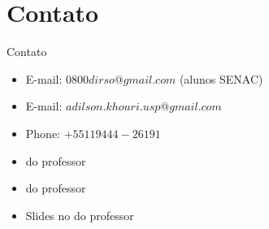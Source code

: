 \section*{Contato}

\begin{frame}	
	\begin{block}{Contato}	
		\begin{itemize}
			\item E-mail:  $0800dirso@gmail.com$ (alunos SENAC)			
			\item E-mail:  $adilson.khouri.usp@gmail.com$
			\item Phone: $+55 11 9444-26191$
			\item \href{https://www.linkedin.com/in/adilson-khouri-51893918/}{\color{blue}{Linkedin}} do professor
			\item \href{http://lattes.cnpq.br/2654721135214993}{\color{blue}{Lattes}} do professor
			\item Slides no \href{https://github.com/khouri/}{\color{blue}{GitHub}} do professor
		\end{itemize}
	\end{block}
\end{frame}

